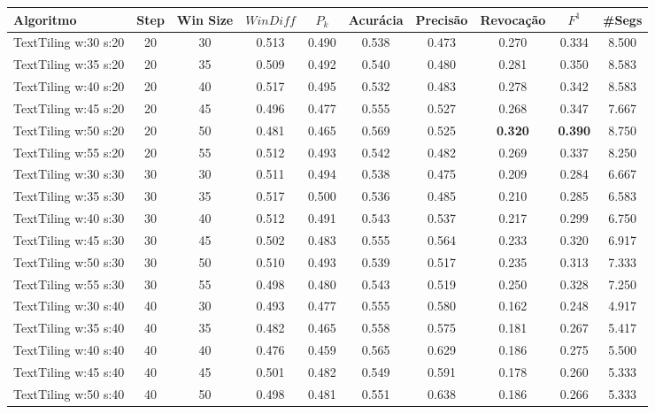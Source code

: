 \documentclass{article}
\begin{document}
 

\begin{longtable}[c]{|l|c|c|c|c|c|c|c|c|c|} 
\hline 
Algoritmo & Step & Win Size & $WinDiff$ & $P_k$ & Acurácia & Precisão & Revocação & $F^1$ & \#Segs\\ \hline 
TextTiling w:30 s:20 & 20 & 30 & 0.513 & 0.490 & 0.538 & 0.473 & 0.270 & 0.334 & 8.500  \\ \hline 
 TextTiling w:35 s:20 & 20 & 35 & 0.509 & 0.492 & 0.540 & 0.480 & 0.281 & 0.350 & 8.583  \\ \hline 
 TextTiling w:40 s:20 & 20 & 40 & 0.517 & 0.495 & 0.532 & 0.483 & 0.278 & 0.342 & 8.583  \\ \hline 
 TextTiling w:45 s:20 & 20 & 45 & 0.496 & 0.477 & 0.555 & 0.527 & 0.268 & 0.347 & 7.667  \\ \hline 
 TextTiling w:50 s:20 & 20 & 50 & 0.481 & 0.465 & 0.569 & 0.525 & \cellcolor{gray!20} \textbf{0.320} & \cellcolor{gray!20} \textbf{0.390} & 8.750  \\ \hline 
 TextTiling w:55 s:20 & 20 & 55 & 0.512 & 0.493 & 0.542 & 0.482 & 0.269 & 0.337 & 8.250  \\ \hline 
 TextTiling w:30 s:30 & 30 & 30 & 0.511 & 0.494 & 0.538 & 0.475 & 0.209 & 0.284 & 6.667  \\ \hline 
 TextTiling w:35 s:30 & 30 & 35 & 0.517 & 0.500 & 0.536 & 0.485 & 0.210 & 0.285 & 6.583  \\ \hline 
 TextTiling w:40 s:30 & 30 & 40 & 0.512 & 0.491 & 0.543 & 0.537 & 0.217 & 0.299 & 6.750  \\ \hline 
 TextTiling w:45 s:30 & 30 & 45 & 0.502 & 0.483 & 0.555 & 0.564 & 0.233 & 0.320 & 6.917  \\ \hline 
 TextTiling w:50 s:30 & 30 & 50 & 0.510 & 0.493 & 0.539 & 0.517 & 0.235 & 0.313 & 7.333  \\ \hline 
 TextTiling w:55 s:30 & 30 & 55 & 0.498 & 0.480 & 0.543 & 0.519 & 0.250 & 0.328 & 7.250  \\ \hline 
 TextTiling w:30 s:40 & 40 & 30 & 0.493 & 0.477 & 0.555 & 0.580 & 0.162 & 0.248 & 4.917  \\ \hline 
 TextTiling w:35 s:40 & 40 & 35 & 0.482 & 0.465 & 0.558 & 0.575 & 0.181 & 0.267 & 5.417  \\ \hline 
 TextTiling w:40 s:40 & 40 & 40 & 0.476 & 0.459 & 0.565 & 0.629 & 0.186 & 0.275 & 5.500  \\ \hline 
 TextTiling w:45 s:40 & 40 & 45 & 0.501 & 0.482 & 0.549 & 0.591 & 0.178 & 0.260 & 5.333  \\ \hline 
 TextTiling w:50 s:40 & 40 & 50 & 0.498 & 0.481 & 0.551 & 0.638 & 0.186 & 0.266 & 5.333  \\ \hline 

\end{longtable}
\end{document}
